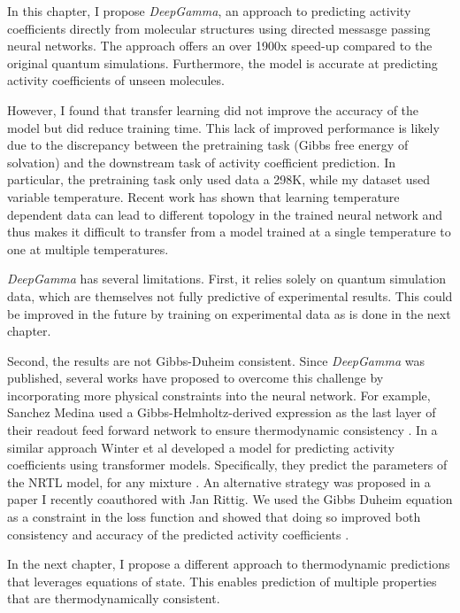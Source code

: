 In this chapter, I propose \textit{DeepGamma}, an approach to predicting activity coefficients directly from molecular structures using directed messasge passing neural networks. The approach offers an over 1900x speed-up compared to the original quantum simulations.  Furthermore, the model is accurate at predicting activity coefficients of unseen molecules.

However, I found that transfer learning did not improve the accuracy of the model but did reduce training time. This lack of improved performance is likely due to the discrepancy between the pretraining task (Gibbs free energy of solvation) and the downstream task of activity coefficient prediction. In particular, the pretraining task only used data a 298K, while my dataset used variable temperature. Recent work \cite{Lansford2023} has shown that learning temperature dependent data can lead to different topology in the trained neural network and thus makes it difficult to transfer from a model trained at a single temperature to one at multiple temperatures.

\textit{DeepGamma} has several limitations. First,  it relies solely on quantum simulation data, which are themselves not fully predictive of experimental results. This could be improved in the future by training on experimental data as is done in the next chapter.

Second, the results are not Gibbs-Duheim  consistent. Since \textit{DeepGamma} was published, several works have proposed to overcome this challenge by incorporating more physical constraints into the neural network. For example, Sanchez Medina used  a Gibbs-Helmholtz-derived expression as the last layer of their readout feed forward network to ensure thermodynamic consistency \cite{SanchezMedina2023}. In a similar approach Winter et al developed a model for predicting activity coefficients using transformer models. Specifically, they predict the parameters of the NRTL model, for any mixture \cite{Winter2022}. An alternative strategy was proposed in a paper I recently coauthored with Jan Rittig. We used the Gibbs Duheim equation as a constraint in the loss function and showed that doing so improved both consistency and accuracy of the predicted activity coefficients \cite{Rittig2023b}. 

In the next chapter, I propose a different approach to thermodynamic predictions that leverages equations of state. This enables prediction of multiple properties that are thermodynamically consistent.

